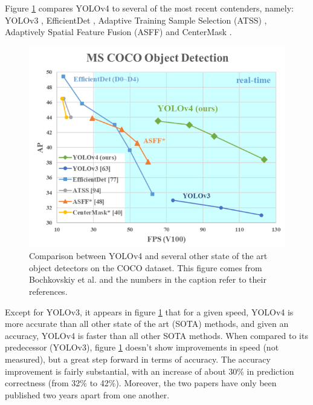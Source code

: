 \documentclass[runningheads]{llncs}
\begin{document}
Figure \ref{fig: SOTA comparison} compares YOLOv4 to several of the most recent contenders, namely: YOLOv3 \cite{redmon_yolov3_2018}, EfficientDet \cite{tan_efficientdet_2020}, Adaptive Training Sample Selection (ATSS) \cite{zhang_bridging_2020}, Adaptively Spatial Feature Fusion (ASFF) \cite{liu_learning_2019} and CenterMask \cite{lee_centermask_2020}.

\begin{figure}
    \centering
    \includegraphics[width=.7\textwidth]{media/YOLO_performance_comparison.png}
    \caption{Comparison between YOLOv4 and several other state of the art object detectors on the COCO dataset. This figure comes from Bochkovskiy et al. \cite{bochkovskiy_yolov4_2020} and the numbers in the caption refer to their references.}
    \label{fig: SOTA comparison}
\end{figure}

Except for YOLOv3, it appears in figure \ref{fig: SOTA comparison} that for a given speed, YOLOv4 is more accurate than all other state of the art (SOTA) methods, and given an accuracy, YOLOv4 is faster than all other SOTA methods. When compared to its predecessor (YOLOv3), figure \ref{fig: SOTA comparison} doesn't show improvements in speed (not measured), but a great step forward in terms of accuracy. The accuracy improvement is fairly substantial, with an increase of about 30\% in prediction correctness (from 32\% to 42\%). Moreover, the two papers have only been published two years apart from one another.
\end{document}
